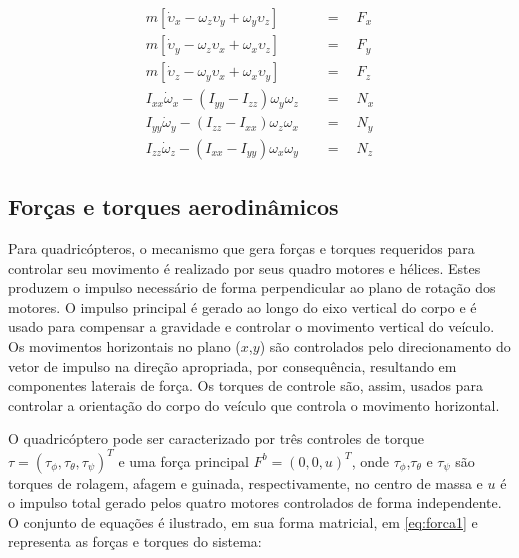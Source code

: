 \documentclass[a4paper, 12pt]{article}
\begin{document}
\begin{equation}
\begin{aligned}
	m\left[ { \dot { \upsilon  }  }_{ x } - { \omega  }_{ z }\upsilon_{ y } + { \omega  }_{ y }{ \upsilon  }_{ z } \right] \quad &=\quad { F }_{ x } \\ 
	m\left[ { \dot { \upsilon  }  }_{ y } - { \omega  }_{ z }\upsilon_{ x } + { \omega  }_{ x }{ \upsilon  }_{ z } \right] \quad &=\quad { F }_{ y } \\
	m\left[ { \dot { \upsilon  }  }_{ z } - { \omega  }_{ y }\upsilon_{ x } + { \omega  }_{ x }{ \upsilon  }_{ y } \right] \quad &=\quad { F }_{ z } \\ 
	{ I }_{ xx }{ \dot { \omega  }  }_{ x } - (I_{ yy } - I_{ zz }){ \omega  }_{ y }{ \omega  }_{ z }\quad &=\quad N_{ x } \\
	{ I }_{ yy }{ \dot { \omega  }  }_{ y } - (I_{ zz } - I_{ xx }){ \omega  }_{ z }{ \omega  }_{ x }\quad &=\quad N_{ y }\\
	{ I }_{ zz }{ \dot { \omega  }  }_{ z } - (I_{ xx } - I_{ yy }){ \omega  }_{ x }{ \omega  }_{ y }\quad &=\quad N_{ z }
\end{aligned}
\label{eq:motion}
\end{equation}

\subsection{Forças e torques aerodinâmicos}

Para quadricópteros, o mecanismo que gera forças e torques requeridos para controlar seu movimento é realizado por seus quadro motores e hélices. Estes produzem o impulso necessário de forma perpendicular ao plano de rotação dos motores. O impulso principal é gerado ao longo do eixo vertical do corpo e é usado para compensar a gravidade e controlar o movimento vertical do veículo. Os movimentos horizontais no plano ($x$,$y$) são controlados pelo direcionamento do vetor de impulso na direção apropriada, por consequência, resultando em componentes laterais de força. Os torques de controle são, assim, usados para controlar a orientação do corpo do veículo que controla o movimento horizontal.

O quadricóptero pode ser caracterizado por três controles de torque $\tau = (\tau_\phi,\tau_\theta,\tau_\psi)^T$ e uma força principal $F^b = (0,0,u)^T$, onde $\tau_\phi$,$\tau_\theta$ e $\tau_\psi$ são torques de rolagem, afagem e guinada, respectivamente, no centro de massa e $u$ é o impulso total gerado pelos quatro motores controlados de forma independente. O conjunto de equações é ilustrado, em sua forma matricial, em \ref{eq:forca1} e representa  as forças e torques do sistema:
\end{document}
